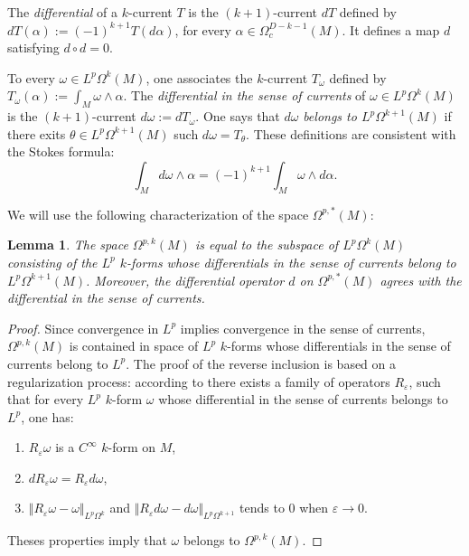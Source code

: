 \documentclass[JEP,XML,SOM,Unicode,published]{cedram}
\theoremstyle{plain}
\newtheorem{lemma}[equation]{Lemma}
\theoremstyle{remark}
\theoremstyle{definition}
\begin{document}
The
\textit{differential} of a $k$-current $T$ is the $(k+1)$-current $dT$ defined
by $dT(\alpha):= (-1)^{k+1} T(d\alpha)$, for every $\alpha \in
\Omega_c^{D-k-1} (M)$. It defines a map $d$ satisfying $d \circ d =0$.

To every $\omega \in L^p \Omega^k(M)$, one associates the $k$-current $T_\omega$
defined by $T_\omega (\alpha):= \int_M \omega \wedge \alpha$.
The \textit{differential in the sense of currents} of $\omega \in L^p \Omega^k(M)$ is the $(k+1)$-current
$d\omega:= dT_\omega$.
One says that $d\omega$ \textit{belongs to $L^p \Omega^{k+1}(M)$} if there exits
$\theta \in L^p \Omega^{k+1}(M)$ such $d\omega = T_\theta$. These definitions are consistent with the Stokes formula:
\[\int_M d\omega \wedge \alpha = (-1)^{k+1} \int_M \omega \wedge d \alpha.\]

We will use the following characterization of the space $\Omega^{p,*}(M)$:

\begin{lemma}
\label{omega-lemma}
The space $\Omega^{p,k} (M)$ is equal to the subspace
of $L^p \Omega^k (M)$ consisting
of the $L^p$ $k$-forms whose differentials in the sense of currents belong to $L^p \Omega^{k+1} (M)$.
Moreover, the differential operator $d$ on $\Omega^{p,*} (M)$ agrees with the differential in the sense of currents.
\end{lemma}

\begin{proof} Since convergence in $L^p$ implies convergence in the sense of currents, $\Omega^{p,k} (M)$ is contained in space of $L^p$ $k$-forms whose differentials in the sense of currents belong
to $L^p$. The proof of the reverse inclusion is based on a regularization process: according to \cite[Th.\,12.5]{GT06}
there exists a family of operators $R_\varepsilon$, such that for every $L^p$ $k$-form $\omega$ whose differential in the sense of currents belongs
to $L^p$, one has:
\begin{enumerate}
\item $R_\varepsilon \omega$ is a $C^\infty$ $k$-form on $M$,
\item $dR_\varepsilon \omega = R_\varepsilon d\omega$,
\item $\Vert R_\varepsilon \omega - \omega \Vert_{L^p \Omega^k}$ and
$\Vert R_\varepsilon d\omega - d\omega \Vert_{L^p \Omega^{k+1}}$ tends to $0$ when $\varepsilon \to 0$.
\end{enumerate}
Theses properties imply that $\omega$ belongs to $\Omega^{p,k} (M)$.
\end{proof}
\end{document}
